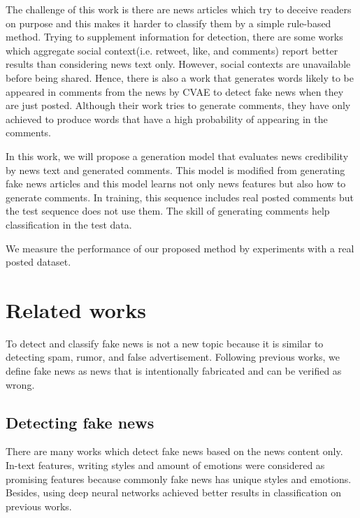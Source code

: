 \documentclass[conference]{IEEEtran}
\begin{document}
The challenge of this work is there are news articles which try to deceive readers on purpose
and this makes it harder to classify them by a simple rule-based method.
Trying to supplement information for detection,
there are some works which aggregate social context(i.e. retweet, like, and comments)
report better results than considering news text only\cite{Guo:2018:RDH:3269206.3271709}.
However, social contexts are unavailable before being shared.
Hence, there is also a work that generates words likely to be appeared in comments from the news by CVAE to detect fake news when they are just posted\cite{ijcai2018-533}.
Although their work tries to generate comments, they have only achieved to produce words that have a high probability of appearing in the comments.

In this work, we will propose a generation model that evaluates news credibility by news text and generated comments.
This model is modified from generating fake news articles\cite{NIPS2019_9106} and this model learns not only news features but also how to generate comments.
In training, this sequence includes real posted comments but the test sequence does not use them.
The skill of generating comments help classification in the test data.

We measure the performance of our proposed method by experiments with a real posted dataset.

\section{Related works}
To detect and classify fake news is not a new topic because it is similar to detecting spam\cite{shen2017discovering}, rumor\cite{7023340}, and false advertisement\cite{Huang:2017:DFO:3041021.3054233}.
Following previous works\cite{Shu:2017:FND:3137597.3137600,Ruchansky:2017:CHD:3132847.3132877,Wang:2018:EEA:3219819.3219903},
we define fake news as news that is intentionally fabricated and can be verified as wrong.

\subsection{Detecting fake news}
There are many works which detect fake news based on the news content only.
In-text features, writing styles\cite{DBLP:journals/corr/PotthastKRBS17} and amount of emotions\cite{DBLP:journals/corr/abs-1903-01728}
were considered as promising features because commonly fake news has unique styles and emotions.
Besides, using deep neural networks achieved better results in classification on previous works\cite{wang-2017-liar,karimi-tang-2019-learning,karimi-etal-2018-multi}.
\end{document}
